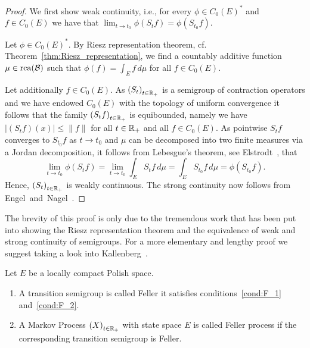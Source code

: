 \documentclass[../Master.tex]{subfiles}
\begin{document}
\begin{proof}
  We first show weak continuity, i.e., for every \(\phi \in {C_0(E)}^*\) and \(f \in C_0(E)\) we have that \(\lim_{t \to t_0} \phi(S_t f) = \phi(S_{t_0} f)\).

  Let \(\phi \in {C_0(E)}^*\). By Riesz representation theorem, cf. Theorem~\ref{thm:Riesz_representation}, we find a countably additive function \(\mu \in \mathrm{rca}(\mathcal{B})\) such that \(\phi(f) = \int_E f \, d \mu{}\) for all \(f \in C_0(E)\).
  
  Let additionally \(f \in C_0(E)\). As \({(S_t)}_{t \in \mathbb{R}_+}\) is a semigroup of contraction operators and we have endowed \(C_0(E)\) with the topology of uniform convergence it follows that the family \({(S_t f)}_{t \in \mathbb{R}_+}\) is equibounded, namely we have \(\rvert (S_t f)(x) \lvert \le \lVert f \rVert{}\) for all \(t \in \mathbb{R}_+\) and all \(f \in C_0(E)\). As pointwise \(S_t f\) converges to \(S_{t_0} f\) as \(t \to t_0\) and \(\mu{}\) can be decomposed into two finite measures via a Jordan decomposition, it follows from Lebesgue's theorem, see Elstrodt~\cite[Theorem IV.5.2]{elstrodt_mas-_2005}, that
  \begin{equation*}
    \lim_{t \to t_0} \phi(S_t f) = \lim_{t \to t_0} \int_E S_t f \, d\mu  = \int_E S_{t_0} f \, d\mu = \phi(S_{t_0} f).
  \end{equation*}
  Hence, \({(S_t)}_{t \in \mathbb{R}_+}\) is weakly continuous. The strong continuity now follows from Engel~and~Nagel~\cite[Theorem I.5.8]{engel_one-parameter_2006}.
\end{proof}

The brevity of this proof is only due to the tremendous work that has been put into showing the Riesz representation theorem and the equivalence of weak and strong continuity of semigroups. For a more elementary and lengthy proof we suggest taking a look into Kallenberg~\cite[Theorems 19.4 and Theorem 19.6]{kallenberg_foundations_2002}.

\begin{definition}
  Let \(E\) be a locally compact Polish space.
  \begin{enumerate}[label = (\roman*)]
    \item A transition semigroup is called Feller it satisfies conditions~\ref{cond:F_1} and~\ref{cond:F_2}.
    \item A Markov Process \({(X)}_{t \in \mathbb{R}_+}\) with state space \(E\) is called Feller process if the corresponding transition semigroup is Feller.
  \end{enumerate}
\end{definition}
\end{document}
